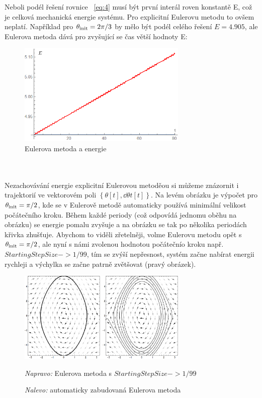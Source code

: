 \documentclass[reqno, a4paper]{amsart}
\begin{document}
Neboli podél řešení rovnice ~\eqref{eq:4} musí být první interál roven konstantě E, což je celková mechanická energie systému.
Pro explicitní Eulerovu metodu to ovšem neplatí. Například pro $\theta_{\mathrm{init}} =2\pi/3$ by mělo být podél celého řešení $E=4.905$, ale Eulerova metoda dává pro zvyšující se čas větší hodnoty E:
\begin{figure}[h]
	\centering
	\includegraphics[width=0.72\textwidth]{energie}
	\caption{Eulerova metoda a energie}  
\end{figure}
\\
\\
Nezachovávání energie explicitní Eulerovou metoděou si můžeme znázornit i trajektorií ve vektorovém poli ${\left\lbrace \theta[t],\dd{\theta}{t}[t]\right\rbrace }$. Na levém obrázku je výpočet pro $\theta_{\mathrm{init}}=\pi/2$, kde se v Eulerově metodě automaticky používá minimální velikost počátečního kroku. Během každé periody (což odpovídá jednomu oběhu na obrázku) se energie pomalu zvyšuje a na obrázku se tak po několika periodách křivka zhušťuje. Abychom to viděli zřetelněji, volme Eulerovu metodu opět s $\theta_{\mathrm{init}}=\pi/2$, ale nyní s námi zvolenou hodnotou počátečnío kroku např. $ StartingStepSize -> 1/99 $, tím se zvýší nepřesnost, systém začne nabírat energii rychleji a výchylka se začne patrně zvětšovat (pravý obrázek).
\begin{figure}[h]
	\centering
	\includegraphics[width=0.72\textwidth]{pole1}
	\caption{\textit{Nalevo:} automaticky zabudovaná Eulerova metoda}  \textit{Napravo:} Eulerova metoda s $StartingStepSize -> 1/99$  
\end{figure}
\end{document}
